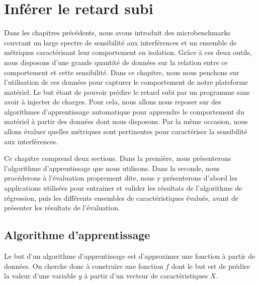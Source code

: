 
\chapter{\label{section:evaluation}Inférer le retard subi}


Dans les chapitres précédents, nous avons introduit des microbenchmarks couvrant un large spectre de sensibilité aux interférences et un ensemble de métriques caractérisant leur comportement en isolation.
Grâce à ces deux outils, nous disposons d'une grande quantité de données sur la relation entre ce comportement et cette sensibilité.
Dans ce chapitre, nous nous penchons sur l'utilisation de ces données pour capturer le comportement de notre plateforme matériel.
Le but étant de pouvoir prédire le retard subi par un programme sans avoir à injecter de charges.
Pour cela, nous allons nous reposer sur des algorithmes d'apprentissage automatique pour apprendre le comportement du matériel à partir des données dont nous disposons.
Par la même occasion, nous allons évaluer quelles métriques sont pertinentes pour caractériser la sensibilité aux interférences.


Ce chapitre comprend deux sections.
Dans la première, nous présenterons l'algorithme d'apprentissage que nous utilisons.
Dans la seconde, nous procéderons à l'évaluation proprement dite, nous y présenterons d'abord les applications utilisées pour entrainer et valider les résultats de l'algorithme de régression, puis les différents ensembles de caractéristiques évalués, avant de présenter les résultats de l'évaluation.

\section{Algorithme d'apprentissage}

Le but d'un algorithme d'apprentissage est d'approximer une fonction à partir de données.
On cherche donc à construire une fonction $f$ dont le but est de prédire la valeur d'une variable $y$ à partir d'un vecteur de caractéristiques $X$. 

